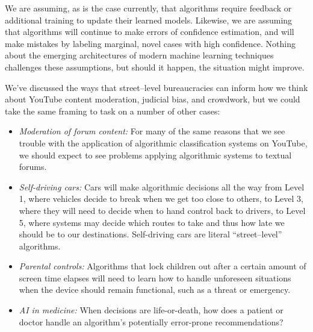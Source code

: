 \documentclass[main]{subfiles}
\begin{document}
We are assuming, as is the case currently, that
algorithms require feedback or additional training to update their learned models.
Likewise, we are assuming that algorithms will continue to make errors of confidence estimation, and
will make mistakes by labeling marginal, novel cases with high confidence.
Nothing about the emerging architectures of modern machine learning techniques challenges these assumptions, but
should it happen, the situation might improve.

We've discussed the ways that
street--level bureaucracies can inform how we think about
YouTube content moderation, judicial bias, and crowdwork,
but we could take the same framing to task on a number of other cases:
\begin{itemize}[leftmargin=*]
  \item \textit{Moderation of forum content: } For many of the same reasons that
           we see trouble with the application of algorithmic classification systems on YouTube,
           we should expect to see problems applying algorithmic systems to textual forums.
  \item \textit{Self-driving cars: } Cars will make algorithmic decisions all the way
         from Level 1, where vehicles decide to break when we get too close to others,
           to Level 3, where they will need to decide when to hand control back to drivers,
           to Level 5, where systems may decide which routes to take
           and thus how late we should be to our destinations.
           Self-driving cars are literal ``street--level'' algorithms.
  \item \textit{Parental controls: } Algorithms that
          lock children out after a certain amount of screen time elapses will need to learn how to handle unforeseen situations
          when the device should remain functional, such as a threat or emergency.
  \item \textit{AI in medicine: } When decisions are life-or-death,
          how does a patient or doctor handle an algorithm's potentially error-prone recommendations?
\end{itemize}


\onlyinsubfile{
  
  
}
\end{document}
